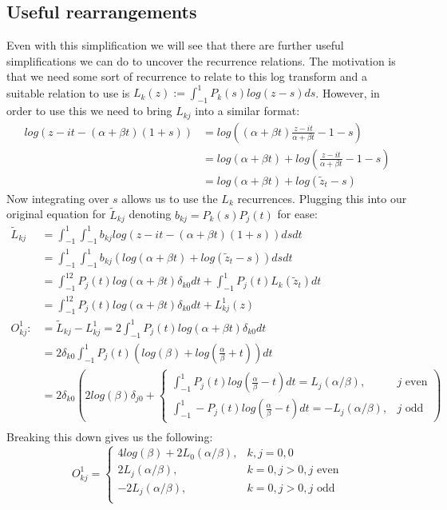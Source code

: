\documentclass{article}
\begin{document}
\subsection{Useful rearrangements}
Even with this simplification we will see that there are further useful simplifications we can do to uncover the recurrence relations.
The motivation is that we need some sort of recurrence to relate to this log transform and a suitable relation to use is $L_k(z):=\int_{-1}^1P_k(s)log(z-s)ds$.
However, in order to use this we need to bring $L_{kj}$ into a similar format:
\begin{align}
    log(z-it-(\alpha+\beta t)(1+s))&=log((\alpha+\beta t)\frac{z-it}{\alpha+\beta t}-1-s)\\
    &=log(\alpha+\beta t)+log(\frac{z-it}{\alpha+\beta t}-1-s)\\
    &=log(\alpha+\beta t)+log(\tilde{z}_t-s)
\end{align}
Now integrating over $s$ allows us to use the $L_k$ recurrences.
Plugging this into our original equation for $\tilde{L}_{kj}$ denoting $b_{kj}=P_k(s)P_j(t)$ for ease:
\begin{align}
    \tilde{L}_{kj}&=\int_{-1}^1\int_{-1}^1b_{kj}log(z-it-(\alpha+\beta t)(1+s))dsdt\\
    &=\int_{-1}^1\int_{-1}^1b_{kj}(log(\alpha+\beta t)+log(\tilde{z}_t-s))dsdt\\
    &=\int_{-1}^12P_j(t)log(\alpha+\beta t)\delta_{k0}dt+\int_{-1}^1P_j(t)L_k(\tilde{z}_t)dt\\
    &=\int_{-1}^12P_j(t)log(\alpha+\beta t)\delta_{k0}dt+L_{kj}^1(z)\\
    O_{kj}^1:&=\tilde L_{kj}-L_{kj}^1=2\int_{-1}^1P_j(t)log(\alpha+\beta t)\delta_{k0}dt\\
    &=2\delta_{k0}\int_{-1}^1P_j(t)(log(\beta)+log(\frac{\alpha}{\beta}+t))dt\\
    &=2\delta_{k0}(2log(\beta)\delta_{j0}+\begin{cases}
	\int_{-1}^1P_j(t)log(\frac{\alpha}{\beta}-t)dt=L_j(\alpha/\beta),&j\text{ even}\\
	\int_{-1}^1-P_j(t)log(\frac{\alpha}{\beta}-t)dt=-L_j(\alpha/\beta),&j\text{ odd}
    \end{cases})\\
\end{align}
Breaking this down gives us the following:
$$
O_{kj}^1=\begin{cases}
    4log(\beta)+2L_0(\alpha/\beta),&k,j=0,0\\
    2L_j(\alpha/\beta),&k=0,j>0,j\text{ even}\\
    -2L_j(\alpha/\beta),&k=0,j>0,j\text{ odd}\\
\end{cases}
$$
\end{document}
